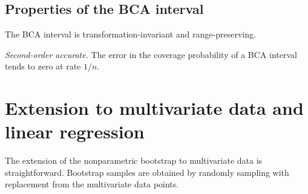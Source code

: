 \subsection{Properties of the BCA interval}
\work
\begin{asparaenum}[(a)]
\item The BCA interval is transformation-invariant and range-preserving.

\item {\it Second-order accurate.} The error in the coverage probability of a BCA interval tends to zero at rate $1/n$.

\end{asparaenum}

\section{Extension to multivariate data and linear regression}
\work
The extension of the nonparametric bootstrap to multivariate data is straightforward. Bootstrap samples are obtained by randomly sampling with replacement from the multivariate data points.


